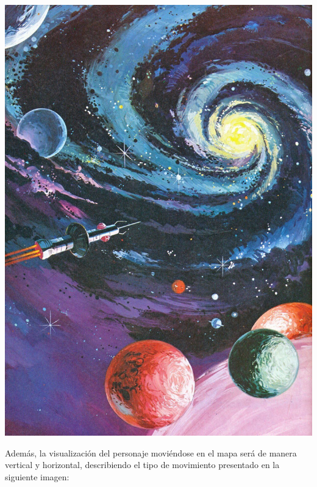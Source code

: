 \documentclass{article}
\begin{document}
\includegraphics[scale=0.21]{Ideación/Images/mapa2.jpeg}

Además, la visualización del personaje moviéndose en el mapa será de manera vertical y horizontal, describiendo el tipo de movimiento presentado en la siguiente imagen:  
\end{document}
